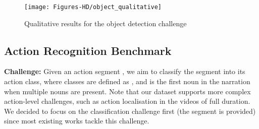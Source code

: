 \documentclass[runningheads]{llncs}
\begin{document}
\begin{figure}[t!]
\vspace{-2mm}
\texttt{[image: Figures-HD/object\_qualitative]}
\vspace{-6mm}
\caption{Qualitative results for the object detection challenge}
\label{fig:qual_obj}
\end{figure}

\vspace{-3mm}
\subsection{Action Recognition Benchmark}
\label{sec:action_recognition_benchmark}
\noindent\textbf{Challenge:} Given an action segment , we aim to classify the segment into its action class, where classes are defined as , and  is the first noun in the narration when multiple nouns are present.
Note that our dataset supports more complex action-level challenges, such as action localisation in the videos of full duration. We decided to focus on the classification challenge first (the segment is provided) since most existing works tackle this challenge.
\end{document}
